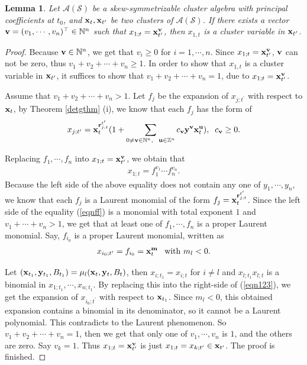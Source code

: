 \documentclass[14pt]{amsart}
\newtheorem{Lemma}[Theorem]{Lemma}
\begin{document}
\begin{Lemma}\label{lemvariable}
Let $\mathcal A(\mathcal S)$ be a skew-symmetrizable cluster algebra with principal coefficients at $t_0$, and ${\bf x}_t, {\bf x}_{t^\prime}$ be two clusters of $\mathcal A(\mathcal S)$.  If there exists a vector ${\bf v}=(v_1,\cdots,v_n)^\top\in\mathbb N^n$ such that $x_{1;t}={\bf x}_{t^\prime}^{\bf v}$, then $x_{1,t}$ is a cluster variable in ${\bf x}_{t^{\prime}}$.
\end{Lemma}
\begin{proof}
Because ${\bf v}\in\mathbb N^n$, we get that $v_i\geq0$ for $i=1,\cdots,n$. Since  $x_{1;t}={\bf x}_{t^\prime}^{\bf v}$,  ${\bf v}$ can not be zero, thus $v_1+v_2+\cdots+v_n\geq 1$.  In order to show that $x_{1,t}$ is a cluster variable in ${\bf x}_{t^{\prime}}$, it suffices to show that $v_1+v_2+\cdots+v_n=1$, due to  $x_{1;t}={\bf x}_{t^\prime}^{\bf v}$.


Assume that $v_1+v_2+\cdots+v_n>1$. Let $f_{j}$ be the expansion of $x_{j;t^\prime}$ with respect to ${\bf x}_t$, by Theorem \ref{detgthm} (i), we know that each $f_j$ has the form of
$$x_{j;t^{\prime}}={\bf x}_{t}^{{\bf r}_{j;t}^{t^{\prime}}}(1+\sum\limits_{0\neq {\bf v}\in\mathbb N^n,~~{\bf u}\in\mathbb Z^n}c_{\bf v}{\bf y}^{\bf v}{\bf x}_t^{\bf u}),\;\;  c_{\bf v}\geq 0.$$

  Replacing $f_1,\cdots, f_n$ into $x_{1;t}={\bf x}_{t^\prime}^{\bf v}$, we obtain that
  \begin{eqnarray}\label{eqnff}
 x_{1;t}=f_{1}^{v_1}\cdots f_{n}^{v_n}.
 \end{eqnarray}
 Because the left side of the above equality does not contain any one of $y_1,\cdots,y_n$, we know that each $f_j$ is a Laurent monomial of the form $f_j={\bf x}_{t}^{{\bf r}_{j;t}^{t^{\prime}}}$. Since the left side of the equality (\ref{eqnff}) is a monomial with total exponent $1$ and $v_1+\cdots+v_n>1$, we get that  at least one of $f_{1},\cdots, f_{n}$ is a proper Laurent monomial.
Say,  $f_{i_0}$  is a proper Laurent monomial, written as
 \begin{eqnarray}\label{eqn123}
 x_{i_0;t^{\prime}}=f_{i_0}={\bf x}_t^{\bf m}\;\;\;\text{with }m_l<0.
 \end{eqnarray}

 Let  $({\bf x}_{t_1},{\bf y}_{t_1}, B_{t_1})=\mu_{l}({\bf x}_{t},{\bf y}_{t}, B_{t})$, then $x_{i;t_1}=x_{i;t}$ for $i\neq l$ and $x_{l;t_1}x_{l;t}$ is a binomial in $x_{1;t_1},\cdots,x_{n;t_1}$. By replacing this into the right-side of (\ref{eqn123}), we get the expansion of $x_{i_0;t^{\prime}}$ with respect to ${\bf x}_{t_1}$. Since $m_l<0$, this obtained expansion  contains a binomial in its denominator, so it  cannot be a Laurent polynomial. This contradicts to the Laurent phenomenon. So $v_1+v_2+\cdots+v_n=1$, then we get that only one of $v_1,\cdots,v_n$ is $1$, and the others are zero. Say $v_k=1$. Thus  $x_{1;t}={\bf x}_{t^\prime}^{\bf v}$ is just $x_{1;t}=x_{k;t^\prime}\in {\bf x}_{t^{\prime}}$. The proof is finished.
\end{proof}
\end{document}
